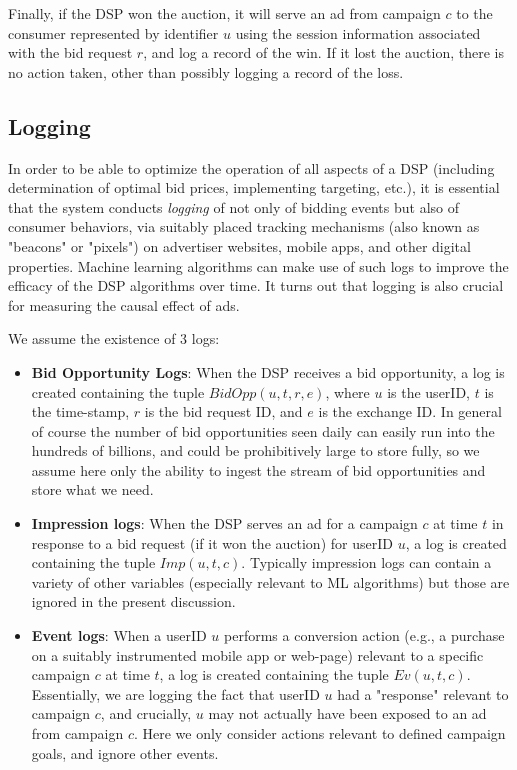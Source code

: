 \documentclass[11pt,a4paper]{article}
\theoremstyle{definition}
\theoremstyle{remark}
\theoremstyle{definition}
\theoremstyle{definition}
\theoremstyle{definition}
\theoremstyle{definition}
\theoremstyle{definition}
\theoremstyle{definition}
\begin{document}
Finally, if the DSP won the auction, it will serve an ad from campaign $c$ to the consumer represented by identifier $u$ using the session information associated with the bid request $r$, and log a record of the win. If it lost the auction, there is no action taken, other than possibly logging a record of the loss. 


\subsection{Logging}

In order to be able to optimize the operation of all aspects of a DSP (including determination of optimal bid prices, implementing targeting, etc.), it is essential that the system conducts {\em logging} of not only of bidding events but also of consumer behaviors, via suitably placed tracking mechanisms (also known as "beacons" or "pixels") on advertiser websites, mobile apps, and other digital properties. Machine learning algorithms can make use of such logs to improve the efficacy of the DSP algorithms over time. It turns out that logging is also crucial for measuring the causal effect of ads. 

We assume the existence of 3 logs:
\begin{itemize}
	\item {\bf Bid Opportunity Logs}: When the DSP receives a bid opportunity, a log is created containing the tuple $BidOpp(u, t, r, e)$, where $u$ is the userID, $t$ is the time-stamp, $r$ is the bid request ID, and $e$ is the exchange ID. In general of course the number of bid opportunities seen daily can easily run into the hundreds of billions, and could be prohibitively large to store fully, so we assume here only the ability to ingest the stream of bid opportunities and store what we need.
	\item {\bf Impression logs}: When the DSP serves an ad for a campaign $c$ at time $t$ in response to a bid request (if it won the auction) for userID $u$, a log is created containing the tuple $Imp(u,t,c)$. Typically impression logs can contain a variety of other variables (especially relevant to ML algorithms) but those are ignored in the present discussion.
	\item {\bf Event logs}: When a userID $u$ performs a conversion action (e.g., a purchase on a suitably instrumented mobile app or web-page) relevant to a specific campaign $c$ at time $t$, a log is created containing the tuple $Ev(u, t, c)$. Essentially, we are logging the fact that userID $u$ had a "response" relevant to campaign $c$, and crucially, $u$ may not actually have been exposed to an ad from campaign $c$. Here we only consider actions relevant to defined campaign goals, and ignore other events.
\end{itemize}
\end{document}

